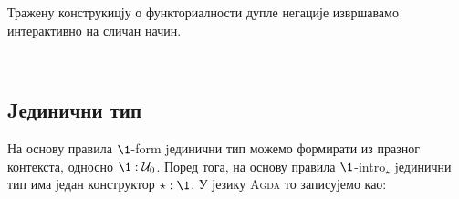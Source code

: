 Тражену конструкицју о функториалности дупле негације извршавамо интерактивно на сличан начин.
\begin{code}%
\>[0]\AgdaSpace{}%
\AgdaSymbol{:}\AgdaSpace{}%
\AgdaSymbol{\{}\AgdaSpace{}%
\AgdaSymbol{:}\AgdaSpace{}%
\AgdaSpace{}%
\AgdaSpace{}%
\AgdaSymbol{\}}\AgdaSpace{}%
\AgdaSymbol{\{}\AgdaSpace{}%
\AgdaSymbol{:}\AgdaSpace{}%
\AgdaSpace{}%
\AgdaSpace{}%
\AgdaSymbol{\}}\AgdaSpace{}%
\AgdaSpace{}%
\AgdaSymbol{(}\AgdaSpace{}%
\AgdaSpace{}%
\AgdaSymbol{)}\AgdaSpace{}%
\AgdaSpace{}%
\AgdaSymbol{(}\AgdaSpace{}%
\AgdaSpace{}%
\AgdaSpace{}%
\AgdaSpace{}%
\AgdaSymbol{)}\<%
\\
\>[0]\AgdaSpace{}%
\AgdaSpace{}%
\AgdaSpace{}%
\AgdaSpace{}%
\AgdaSymbol{=}\AgdaSpace{}%
\AgdaSpace{}%
\AgdaSymbol{(}\AgdaSpace{}%
\AgdaSpace{}%
\AgdaSymbol{)}\<%
\end{code}

\subsection{Jединични тип}

На основу правила $\1$-form jединични тип можемо формирати из празног контекста, односно $\1 : \mathcal{U}_0$. Поред тога, на основу правила $\1$-intro$_\star$ jединични тип има један конструктор $\star : \1$. У језику \textsc{Agda} то записујемо као:
\begin{code}%
\>[0]\AgdaSpace{}%
\AgdaSpace{}%
\AgdaSymbol{:}\AgdaSpace{}%
\AgdaSpace{}%
\AgdaSpace{}%
\<%
\\
\>[0][@{}l@{\AgdaIndent{0}}]%
\>[4]\AgdaSpace{}%
\AgdaSymbol{:}\AgdaSpace{}%
\<%
\end{code}

